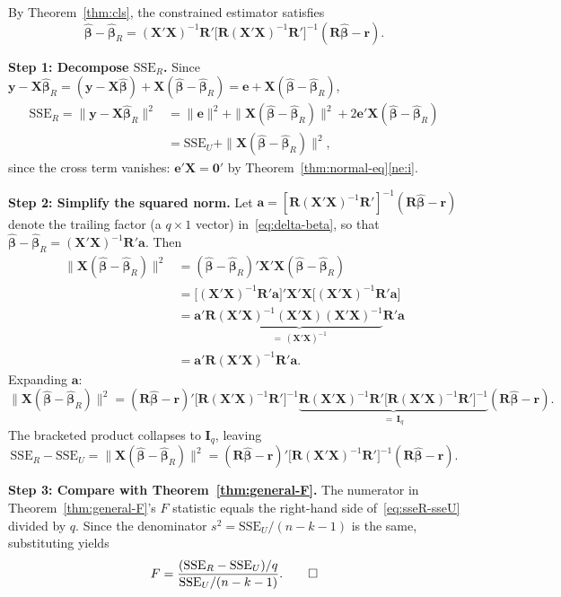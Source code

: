 \documentclass[12pt,a4paper]{article}
\makeatletter
\theoremstyle{definition}
\renewenvironment{proof}[1][\proofname]{\par
  \pushQED{\qed}%
  \normalfont \topsep6\p@\@plus6\p@\relax
  \trivlist
  \item[\hskip\labelsep\bfseries #1\@addpunct{.}]\ignorespaces
}{%
  \popQED\endtrivlist\@endpefalse
}
\newcommand{\SSE}{\mathrm{SSE}}
\newcommand{\bX}{\mathbf{X}}
\newcommand{\by}{\mathbf{y}}
\def\bb{\boldsymbol{\beta}}
\newcommand{\bI}{\mathbf{I}}
\newcommand{\bR}{\mathbf{R}}
\newcommand{\br}{\mathbf{r}}
\newcommand{\bzero}{\mathbf{0}}
\newcommand{\ba}{\mathbf{a}}
\makeatother
\begin{document}
\begin{proof}
By Theorem~\ref{thm:cls}, the constrained estimator satisfies
\begin{equation}\label{eq:delta-beta}
\hat{\bb} - \hat{\bb}_R = (\bX'\bX)^{-1}\bR'\bigl[\bR(\bX'\bX)^{-1}\bR'\bigr]^{-1}(\bR\hat{\bb} - \br).
\end{equation}

\textbf{Step 1: Decompose $\SSE_R$.} Since $\by - \bX\hat{\bb}_R = (\by - \bX\hat{\bb}) + \bX(\hat{\bb} - \hat{\bb}_R) = \mathbf{e} + \bX(\hat{\bb} - \hat{\bb}_R)$,
\begin{align*}
\SSE_R = \|\by - \bX\hat{\bb}_R\|^2 &= \|\mathbf{e}\|^2 + \|\bX(\hat{\bb} - \hat{\bb}_R)\|^2 + 2\mathbf{e}'\bX(\hat{\bb} - \hat{\bb}_R)\\
&= \SSE_U + \|\bX(\hat{\bb} - \hat{\bb}_R)\|^2,
\end{align*}
since the cross term vanishes: $\mathbf{e}'\bX = \bzero'$ by Theorem~\ref{thm:normal-eq}\ref{ne:i}.

\textbf{Step 2: Simplify the squared norm.} Let $\ba = [\bR(\bX'\bX)^{-1}\bR']^{-1}(\bR\hat{\bb} - \br)$ denote the trailing factor (a $q \times 1$ vector) in~\eqref{eq:delta-beta}, so that $\hat{\bb} - \hat{\bb}_R = (\bX'\bX)^{-1}\bR'\ba$. Then
\begin{align*}
\|\bX(\hat{\bb} - \hat{\bb}_R)\|^2 &= (\hat{\bb} - \hat{\bb}_R)'\bX'\bX(\hat{\bb} - \hat{\bb}_R)\\
&= \bigl[(\bX'\bX)^{-1}\bR'\ba\bigr]'\bX'\bX\bigl[(\bX'\bX)^{-1}\bR'\ba\bigr]\\
&= \ba'\bR\underbrace{(\bX'\bX)^{-1}(\bX'\bX)(\bX'\bX)^{-1}}_{=\,(\bX'\bX)^{-1}}\bR'\ba\\
&= \ba'\bR(\bX'\bX)^{-1}\bR'\ba.
\end{align*}
Expanding $\ba$:
\[
\|\bX(\hat{\bb} - \hat{\bb}_R)\|^2 = (\bR\hat{\bb} - \br)'\bigl[\bR(\bX'\bX)^{-1}\bR'\bigr]^{-1}\underbrace{\bR(\bX'\bX)^{-1}\bR'\bigl[\bR(\bX'\bX)^{-1}\bR'\bigr]^{-1}}_{=\,\bI_q}(\bR\hat{\bb} - \br).
\]
The bracketed product collapses to $\bI_q$, leaving
\begin{equation}\label{eq:sseR-sseU}
\SSE_R - \SSE_U = \|\bX(\hat{\bb} - \hat{\bb}_R)\|^2 = (\bR\hat{\bb} - \br)'\bigl[\bR(\bX'\bX)^{-1}\bR'\bigr]^{-1}(\bR\hat{\bb} - \br).
\end{equation}

\textbf{Step 3: Compare with Theorem~\ref{thm:general-F}.} The numerator in Theorem~\ref{thm:general-F}'s $F$ statistic equals the right-hand side of~\eqref{eq:sseR-sseU} divided by $q$. Since the denominator $s^2 = \SSE_U/(n-k-1)$ is the same, substituting yields
\[
F = \frac{(\SSE_R - \SSE_U)/q}{\SSE_U/(n-k-1)}. \qedhere
\]
\end{proof}
\end{document}
